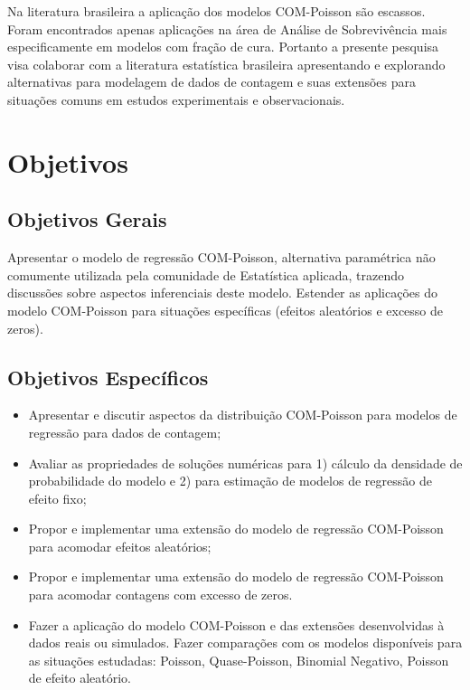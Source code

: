 \documentclass[
12pt,				%
openright,			%
oneside,			%
a4paper,			%
english,			%
brazil,				%
]{abntex2}
\begin{document}
Na literatura brasileira a aplicação dos modelos COM-Poisson são
escassos. Foram encontrados apenas aplicações na área de Análise de
Sobrevivência mais especificamente em modelos com fração de
cura. Portanto a presente pesquisa visa colaborar com a literatura
estatística brasileira apresentando e explorando alternativas para
modelagem de dados de contagem e suas extensões para situações comuns em
estudos experimentais e observacionais.

\chapter{Objetivos}
\label{cha:objetivos}

\section{Objetivos Gerais}
\label{sec:objetivosgerais}

Apresentar o modelo de regressão COM-Poisson, alternativa 
paramétrica não comumente utilizada pela comunidade de 
Estatística aplicada, trazendo discussões sobre aspectos 
inferenciais deste modelo. Estender as aplicações do modelo
COM-Poisson para situações específicas (efeitos aleatórios 
e excesso de zeros).

\section{Objetivos Específicos}
\label{sec:objetivosespecificos}

\begin{itemize}
\item Apresentar e discutir aspectos da distribuição COM-Poisson para
  modelos de regressão para dados de contagem;
  
\item Avaliar as propriedades de soluções numéricas para 1) cálculo da
  densidade de probabilidade do modelo e 2) para estimação de modelos de 
  regressão de efeito fixo;
  
\item Propor e implementar uma extensão do modelo de regressão
  COM-Poisson para acomodar efeitos aleatórios;
  
\item Propor e implementar uma extensão do modelo de regressão
  COM-Poisson para acomodar contagens com excesso de zeros.
  
\item Fazer a aplicação do modelo COM-Poisson e das extensões
  desenvolvidas à dados reais ou simulados. Fazer comparações com os
  modelos disponíveis para as situações estudadas: Poisson,
  Quase-Poisson, Binomial Negativo, Poisson de efeito aleatório.
\end{itemize}
\end{document}
